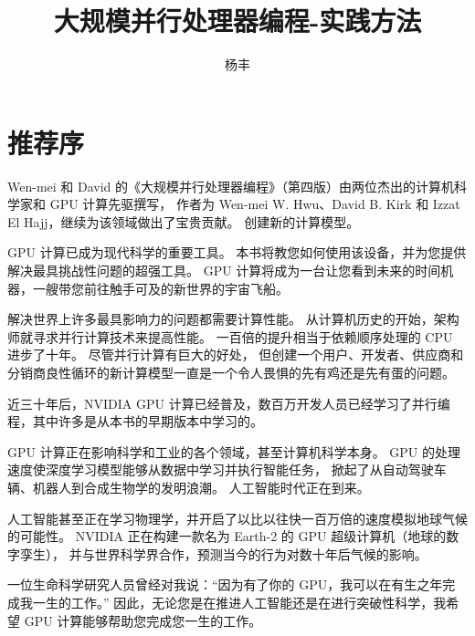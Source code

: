 \documentclass{ctexart}
\numberwithin{figure}{section}
\numberwithin{equation}{section}
\numberwithin{footnote}{section}
\begin{document}
\title{大规模并行处理器编程-实践方法}

\author{杨丰}
\date{}
\maketitle

\tableofcontents

\newpage
\section*{推荐序}
Wen-mei 和 David 的《大规模并行处理器编程》（第四版）由两位杰出的计算机科学家和 GPU 计算先驱撰写，
作者为 Wen-mei W. Hwu、David B. Kirk 和 Izzat El Hajj，继续为该领域做出了宝贵贡献。 创建新的计算模型。

GPU 计算已成为现代科学的重要工具。 本书将教您如何使用该设备，并为您提供解决最具挑战性问题的超强工具。 
GPU 计算将成为一台让您看到未来的时间机器，一艘带您前往触手可及的新世界的宇宙飞船。

解决世界上许多最具影响力的问题都需要计算性能。 从计算机历史的开始，架构师就寻求并行计算技术来提高性能。 
一百倍的提升相当于依赖顺序处理的 CPU 进步了十年。 尽管并行计算有巨大的好处，
但创建一个用户、开发者、供应商和分销商良性循环的新计算模型一直是一个令人畏惧的先有鸡还是先有蛋的问题。

近三十年后，NVIDIA GPU 计算已经普及，数百万开发人员已经学习了并行编程，其中许多是从本书的早期版本中学习的。

GPU 计算正在影响科学和工业的各个领域，甚至计算机科学本身。 GPU 的处理速度使深度学习模型能够从数据中学习并执行智能任务，
掀起了从自动驾驶车辆、机器人到合成生物学的发明浪潮。 人工智能时代正在到来。

人工智能甚至正在学习物理学，并开启了以比以往快一百万倍的速度模拟地球气候的可能性。 
NVIDIA 正在构建一款名为 Earth-2 的 GPU 超级计算机（地球的数字孪生），
并与世界科学界合作，预测当今的行为对数十年后气候的影响。

一位生命科学研究人员曾经对我说：“因为有了你的 GPU，我可以在有生之年完成我一生的工作。” 
因此，无论您是在推进人工智能还是在进行突破性科学，我希望 GPU 计算能够帮助您完成您一生的工作。
\\

\newpage


\newpage


\newpage


\newpage


\newpage

\end{document}
